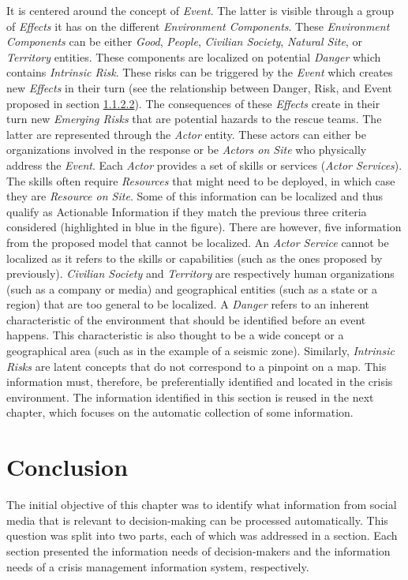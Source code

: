 It is centered around the concept of \textit{Event}.
The latter is visible through a group of \textit{Effects} it has on the different \textit{Environment Components}.
These \textit{Environment Components} can be either \textit{Good}, \textit{People}, \textit{Civilian Society}, \textit{Natural Site}, or \textit{Territory} entities.
These components are localized on potential \textit{Danger} which contains \textit{Intrinsic Risk}.
These risks can be triggered by the \textit{Event} which creates new \textit{Effects} in their turn (see the relationship between Danger, Risk, and Event proposed in section \hyperref[sec:danger-risk-consequence]{1.1.2.2}).
The consequences of these \textit{Effects} create in their turn new \textit{Emerging Risks} that are potential hazards to the rescue teams.
The latter are represented through the \textit{Actor} entity.
These actors can either be organizations involved in the response or be \textit{Actors on Site} who physically address the \textit{Event}.
Each \textit{Actor} provides a set of skills or services (\textit{Actor Services}).
The skills often require \textit{Resources} that might need to be deployed, in which case they are \textit{Resource on Site}.
Some of this information can be localized and thus qualify as Actionable Information if they match the previous three criteria considered (highlighted in blue in the figure).
There are however, five information from the proposed model that cannot be localized.
An \textit{Actor Service} cannot be localized as it refers to the skills or capabilities (such as the ones proposed by \textcite{othmanDevelopmentValidationDisaster2014} previously).
\textit{Civilian Society} and \textit{Territory} are respectively human organizations (such as a company or media) and geographical entities (such as a state or a region) that are too general to be localized.
A \textit{Danger} refers to an inherent characteristic of the environment that should be identified before an event happens.
This characteristic is also thought to be a wide concept or a geographical area (such as in the example of a seismic zone).
Similarly, \textit{Intrinsic Risks} are latent concepts that do not correspond to a pinpoint on a map.
This information must, therefore, be preferentially identified and located in the crisis environment.
The information identified in this section is reused in the next chapter, which focuses on the automatic collection of some information.

\section*{Conclusion}
The initial objective of this chapter was to identify what information from social media that is relevant to decision-making can be processed automatically.
This question was split into two parts, each of which was addressed in a section.
Each section presented the information needs of decision-makers and the information needs of a crisis management information system, respectively.

